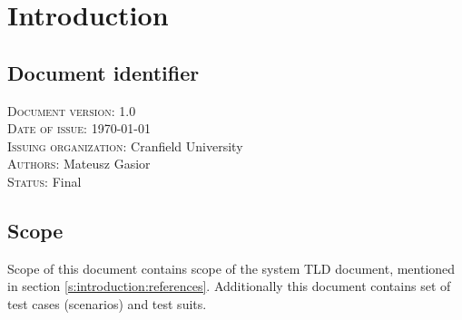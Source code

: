 \chapter{Introduction} \label{chp:introduction}
	\begin{comment}
		Introduce the following subordinate sections. This section identifies the issuing organization and the
		details of issuance. It includes required approvals and status (DRAFT/FINAL) of the document. It is
		here that the scope is described and references identified.
	\end{comment}

\section{Document identifier} \label{s:introduction:document-identifier}
	\begin{comment}
		Uniquely identify a version of the document by including information such as the date of issue, the
		issuing organization, the author(s), the approval signatures (possibly electronic), and the status/version
		(e.g., draft, reviewed, corrected, or final). Identifying information may also include the reviewers and
		pertinent managers. This information is commonly put on an early page in the document, such as the
		cover page or the pages immediately following it. Some organizations put this information at the end
		of the document. This information may also be kept in a place other than in the text of the document
		(e.g., in the configuration management system or in the header or footer of the document).
	\end{comment}
	\textsc{Document version: } 1.0 \\
	\textsc{Date of issue:} \today \\
	\textsc{Issuing organization:} Cranfield University \\
	\textsc{Authors: } Mateusz Gasior \\
	\textsc{Status: } Final \\
\section{Scope} \label{s:introduction:scope}
	\begin{comment}
		Identify the test items (software or system) that are the object of testing, e.g., specific attributes of the
		software, the installation instructions, the user instructions, interfacing hardware, database conversion
		software that is not a part of the operational system) including their version/revision level. Also
		identify any procedures for their transfer from other environments to the test environment.
		Supply references to the test item documentation relevant to an individual level of test, if it exists, such
		as follows:
		⎯ Requirements
		⎯ Design
		⎯ User’s guide
		⎯ Operations guide
		⎯ Installation guide
		Reference any Anomaly Reports relating to the test items.
		Identify any items that are to be specifically excluded from testing.
	\end{comment}
	Scope of this document contains scope of the system \gls{TLD} document, mentioned in section \ref{s:introduction:references}. Additionally this document contains set of test cases (scenarios) and test suits.
